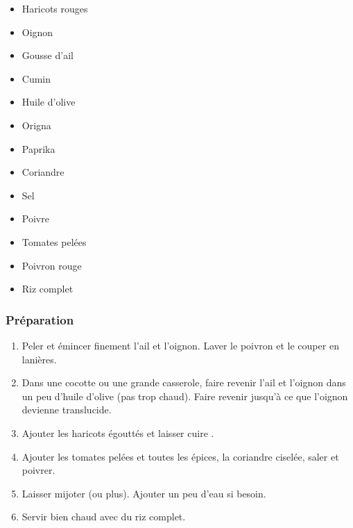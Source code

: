 \begin{multicols}{2}
	\begin{itemize}
		\item Haricots rouges  
		\item Oignon \cuam<chili-sin-carne>{1} \index{Oignon}
		\item Gousse d'ail  
		\item Cumin  
		\item Huile d'olive 
		\item Origna \cunum<chili-sin-carne>{1}{EL} \index{Origan}
		\item Paprika  
		\item Coriandre 
		\item Sel
		\item Poivre
		\item Tomates pelées  
		\item Poivron rouge  
		\item Riz complet 
	\end{itemize}
\end{multicols}

\subsubsection*{Préparation}

\begin{enumerate}
	\item Peler et émincer finement l'ail et l'oignon.
	Laver le poivron et le couper en lanières.
	\item Dans une cocotte ou une grande casserole, faire revenir l'ail et l'oignon dans un peu d'huile d'olive (pas trop chaud).
	Faire revenir jusqu'à ce que l'oignon devienne translucide.
	\item Ajouter les haricots égouttés et laisser cuire .
	\item Ajouter les tomates pelées et toutes les épices, la coriandre ciselée, saler et poivrer.
	\item Laisser mijoter  (ou plus).
	Ajouter un peu d'eau si besoin.
	\item Servir bien chaud avec du riz complet.
\end{enumerate}
